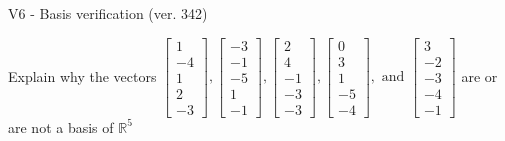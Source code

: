 \begin{exercise}
  \begin{exerciseTitle}V6 - Basis verification (ver. 342)\end{exerciseTitle}
  \begin{exerciseStatement}
    Explain why the vectors \(\left[\begin{array}{r}
1 \\
-4 \\
1 \\
2 \\
-3
\end{array}\right] , \left[\begin{array}{r}
-3 \\
-1 \\
-5 \\
1 \\
-1
\end{array}\right] , \left[\begin{array}{r}
2 \\
4 \\
-1 \\
-3 \\
-3
\end{array}\right] , \left[\begin{array}{r}
0 \\
3 \\
1 \\
-5 \\
-4
\end{array}\right] , \text{ and } \left[\begin{array}{r}
3 \\
-2 \\
-3 \\
-4 \\
-1
\end{array}\right]\) are or are not a basis of \(\mathbb{R}^5\)	



\end{exerciseStatement}
\end{exercise}
